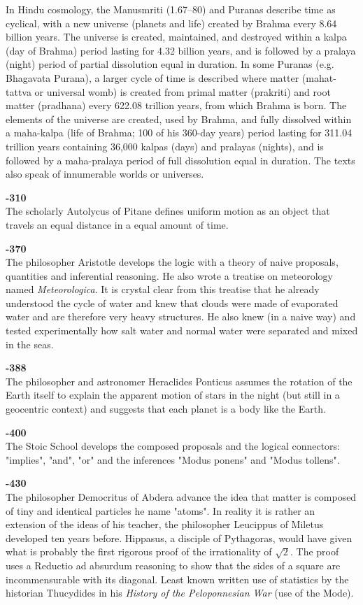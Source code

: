 In Hindu cosmology, the Manusmriti (1.67–80) and Puranas describe time as cyclical, with a new universe (planets and life) created by Brahma every 8.64 billion years. The universe is created, maintained, and destroyed within a kalpa (day of Brahma) period lasting for 4.32 billion years, and is followed by a pralaya (night) period of partial dissolution equal in duration. In some Puranas (e.g. Bhagavata Purana), a larger cycle of time is described where matter (mahat-tattva or universal womb) is created from primal matter (prakriti) and root matter (pradhana) every 622.08 trillion years, from which Brahma is born. The elements of the universe are created, used by Brahma, and fully dissolved within a maha-kalpa (life of Brahma; 100 of his 360-day years) period lasting for 311.04 trillion years containing 36,000 kalpas (days) and pralayas (nights), and is followed by a maha-pralaya period of full dissolution equal in duration. The texts also speak of innumerable worlds or universes.

\textbf{-310}\\
The scholarly Autolycus of Pitane defines uniform motion as an object that travels an equal distance in a equal amount of time.

\textbf{-370}\\
The philosopher Aristotle develops the logic with a theory of naive proposals, quantities and inferential reasoning. He also wrote a treatise on meteorology named \textit{Meteorologica}. It is crystal clear from this treatise that he already understood the cycle of water and knew that clouds were made of evaporated water and are therefore very heavy structures. He also knew (in a naive way) and tested experimentally how salt water and normal water were separated and mixed in the seas.

\textbf{-388}\\
The philosopher and astronomer Heraclides Ponticus assumes the rotation of the Earth itself to explain the apparent motion of stars in the night (but still in a geocentric context) and suggests that each planet is a body like the Earth.

\textbf{-400}\\
The Stoic School develops the composed proposals and the logical connectors: "implies", "and", "or" and the inferences "Modus ponens" and "Modus tollens".

\textbf{-430}\\
The philosopher Democritus of Abdera advance the idea that matter is composed of tiny and identical particles he name "atoms". In reality it is rather an extension of the ideas of his teacher, the philosopher Leucippus of Miletus developed ten years before. Hippasus, a disciple of Pythagoras, would have given what is probably the first rigorous proof of the irrationality of $\sqrt{2}$. The proof uses a Reductio ad absurdum reasoning to show that the sides of a square are incommensurable with its diagonal. Least known written use of statistics by the historian Thucydides in his \textit{History of the Peloponnesian War} (use of the Mode).


